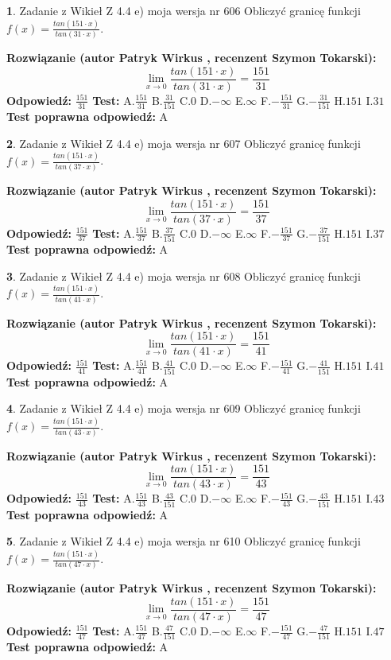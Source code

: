\documentclass[12pt, a4paper]{article}
\theoremstyle{definition} %
\newtheorem{zad}{}
\newcommand{\zadStart}[1]{\begin{zad}#1\newline}
\newcommand{\zadStop}{\end{zad}}
\newcommand{\rozwStart}[2]{\noindent \textbf{Rozwiązanie (autor #1 , recenzent #2): }\newline}
\newcommand{\rozwStop}{\newline}
\newcommand{\odpStart}{\noindent \textbf{Odpowiedź:}\newline}
\newcommand{\odpStop}{\newline}
\newcommand{\testStart}{\noindent \textbf{Test:}\newline}
\newcommand{\testStop}{\newline}
\newcommand{\kluczStart}{\noindent \textbf{Test poprawna odpowiedź:}\newline}
\newcommand{\kluczStop}{\newline}
\begin{document}
\zadStart{Zadanie z Wikieł Z 4.4 e) moja wersja nr 606}
Obliczyć granicę funkcji $f(x)=\frac{tan(151\cdot x)}{tan(31\cdot x)}$.
\zadStop
\rozwStart{Patryk Wirkus}{Szymon Tokarski}
$$\lim\limits_{x\to 0}\frac{tan(151\cdot x)}{tan(31\cdot x)}=
\frac{151}{31}$$
\rozwStop
\odpStart
$\frac{151}{31}$
\odpStop
\testStart
A.$\frac{151}{31}$
B.$\frac{31}{151}$
C.$0$
D.$-\infty$
E.$\infty$
F.$-\frac{151}{31}$
G.$-\frac{31}{151}$
H.$151$
I.$31$
\testStop
\kluczStart
A
\kluczStop



\zadStart{Zadanie z Wikieł Z 4.4 e) moja wersja nr 607}
Obliczyć granicę funkcji $f(x)=\frac{tan(151\cdot x)}{tan(37\cdot x)}$.
\zadStop
\rozwStart{Patryk Wirkus}{Szymon Tokarski}
$$\lim\limits_{x\to 0}\frac{tan(151\cdot x)}{tan(37\cdot x)}=
\frac{151}{37}$$
\rozwStop
\odpStart
$\frac{151}{37}$
\odpStop
\testStart
A.$\frac{151}{37}$
B.$\frac{37}{151}$
C.$0$
D.$-\infty$
E.$\infty$
F.$-\frac{151}{37}$
G.$-\frac{37}{151}$
H.$151$
I.$37$
\testStop
\kluczStart
A
\kluczStop



\zadStart{Zadanie z Wikieł Z 4.4 e) moja wersja nr 608}
Obliczyć granicę funkcji $f(x)=\frac{tan(151\cdot x)}{tan(41\cdot x)}$.
\zadStop
\rozwStart{Patryk Wirkus}{Szymon Tokarski}
$$\lim\limits_{x\to 0}\frac{tan(151\cdot x)}{tan(41\cdot x)}=
\frac{151}{41}$$
\rozwStop
\odpStart
$\frac{151}{41}$
\odpStop
\testStart
A.$\frac{151}{41}$
B.$\frac{41}{151}$
C.$0$
D.$-\infty$
E.$\infty$
F.$-\frac{151}{41}$
G.$-\frac{41}{151}$
H.$151$
I.$41$
\testStop
\kluczStart
A
\kluczStop



\zadStart{Zadanie z Wikieł Z 4.4 e) moja wersja nr 609}
Obliczyć granicę funkcji $f(x)=\frac{tan(151\cdot x)}{tan(43\cdot x)}$.
\zadStop
\rozwStart{Patryk Wirkus}{Szymon Tokarski}
$$\lim\limits_{x\to 0}\frac{tan(151\cdot x)}{tan(43\cdot x)}=
\frac{151}{43}$$
\rozwStop
\odpStart
$\frac{151}{43}$
\odpStop
\testStart
A.$\frac{151}{43}$
B.$\frac{43}{151}$
C.$0$
D.$-\infty$
E.$\infty$
F.$-\frac{151}{43}$
G.$-\frac{43}{151}$
H.$151$
I.$43$
\testStop
\kluczStart
A
\kluczStop



\zadStart{Zadanie z Wikieł Z 4.4 e) moja wersja nr 610}
Obliczyć granicę funkcji $f(x)=\frac{tan(151\cdot x)}{tan(47\cdot x)}$.
\zadStop
\rozwStart{Patryk Wirkus}{Szymon Tokarski}
$$\lim\limits_{x\to 0}\frac{tan(151\cdot x)}{tan(47\cdot x)}=
\frac{151}{47}$$
\rozwStop
\odpStart
$\frac{151}{47}$
\odpStop
\testStart
A.$\frac{151}{47}$
B.$\frac{47}{151}$
C.$0$
D.$-\infty$
E.$\infty$
F.$-\frac{151}{47}$
G.$-\frac{47}{151}$
H.$151$
I.$47$
\testStop
\kluczStart
A
\kluczStop
\end{document}
